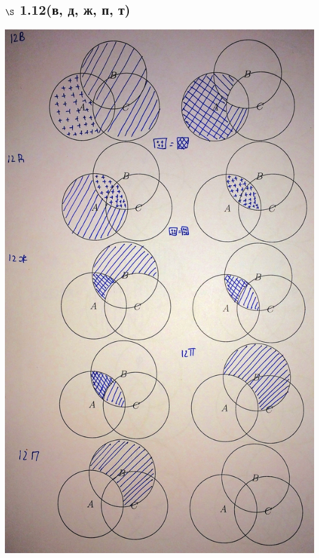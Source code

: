 \documentclass[a4paper,12pt]{article}
\begin{document}
\subsection*{$\S$ 1.12(в, д, ж, п, т)}
\begin{center}
  \includegraphics[scale=0.15]{img/1.jpg}
\end{center}
\end{document}
